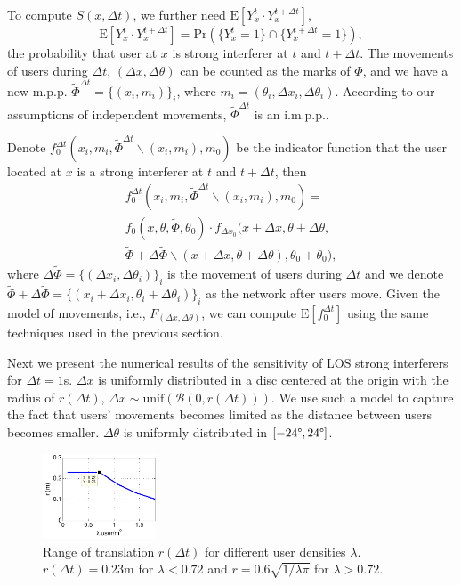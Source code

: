 \documentclass[10pt, conference, letterpaper]{IEEEtran}
\begin{document}
To compute $S(x, \Delta t)$, we further need $\mathrm{E}[Y_x^t\cdot Y_x^{t + \Delta t}]$, 
\begin{equation*}
\mathrm{E}[Y_x^t\cdot Y_x^{t + \Delta t}] = \mathrm{Pr}(\{Y_x^t=1\}\cap \{Y_x^{t+\Delta t}=1\}),
\end{equation*}
the probability that user at $x$ is strong interferer at $t$ and $t + \Delta t$. 
The movements of users during $\Delta t$, $(\Delta x, \Delta \theta)$ can be counted as the marks of $\Phi$, and we have a new m.p.p. $\tilde{\Phi}^{\Delta t} = \{(x_i, m_i)\}_i$, where $m_i = (\theta_i, \Delta x_i, \Delta \theta_i)$. According to our assumptions of independent movements, $\tilde{\Phi}^{\Delta t}$ is an i.m.p.p.. 

Denote $f_0^{\Delta  t}(x_i, m_i, \tilde{\Phi}^{\Delta t}\backslash (x_i, m_i), m_0)$ be the indicator function that the user located at $x$ is a strong interferer at $t$ and $t + \Delta t$, then 
\begin{multline*}
f_0^{\Delta  t}(x_i, m_i, \tilde{\Phi}^{\Delta t}\backslash (x_i, m_i), m_0) = \\
f_0(x,\theta, \tilde{\Phi}, \theta_0) 
\cdot f_{\Delta x_0}(x+\Delta x,\theta + \Delta \theta, 
\\ \tilde{\Phi} + \Delta \tilde{\Phi}\backslash (x+\Delta x,\theta + \Delta \theta), \theta_0+\theta_0),
\end{multline*}
where $\Delta \tilde{\Phi} = \{(\Delta x_i, \Delta \theta_i)\}_i$ is the movement of users during $\Delta t$ and we denote $\tilde{\Phi} + \Delta \tilde{\Phi} = \{(x_i+\Delta x_i, \theta_i + \Delta \theta_i)\}_i$ as the network after users move.  
Given the model of movements, i.e., $F_{(\Delta x, \Delta \theta)}$, we can compute $\mathrm{E}[f_0^{\Delta t}]$ using the same techniques used in the previous section. 

Next we present the numerical results of the sensitivity of LOS strong interferers for $\Delta t= 1$s.
$\Delta x$ is uniformly distributed in a disc centered at the origin with the radius of $r(\Delta t)$, $\Delta x \sim \mathrm{unif}(\mathcal{B}(0, r(\Delta t)))$. We use such a model to capture the fact that users' movements becomes limited as the distance between users becomes smaller. $\Delta \theta$ is uniformly distributed in $[-24\degree, 24 \degree]$.

\begin{figure}
	\centering
	\includegraphics[width = 0.3\textwidth]{Channel_translation_range.pdf}
	\caption{Range of translation $r(\Delta t)$ for different user densities $\lambda$. $r(\Delta t) = 0.23$m for $\lambda<0.72$ and $r = 0.6 \sqrt{1/\lambda\pi}$ for $\lambda >0.72$.}
	\label{fig:Channel_translation_range}
\end{figure}
\end{document}
